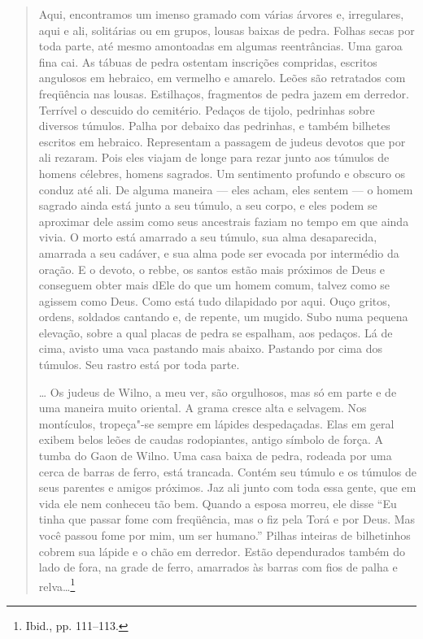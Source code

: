 %
\begin{quote}
Aqui, encontramos um imenso gramado com várias árvores e, irregulares,
aqui e ali, solitárias ou em grupos, lousas baixas de pedra. Folhas
secas por toda parte, até mesmo amontoadas em algumas reentrâncias. Uma
garoa fina cai. As tábuas de pedra ostentam inscrições compridas,
escritos angulosos em hebraico, em vermelho e amarelo. Leões são
retratados com freqüência nas lousas. Estilhaços, fragmentos de pedra
jazem em derredor. Terrível o descuido do cemitério. Pedaços de tijolo,
pedrinhas sobre diversos túmulos. Palha por debaixo das pedrinhas, e
também bilhetes escritos em hebraico. Representam a passagem de judeus
devotos que por ali rezaram. Pois eles viajam de longe para rezar junto
aos túmulos de homens célebres, homens sagrados. Um sentimento profundo
e obscuro os conduz até ali. De alguma maneira --- eles acham, eles sentem
--- o homem sagrado ainda está junto a seu túmulo, a seu corpo, e eles
podem se aproximar dele assim como seus ancestrais faziam no tempo em
que ainda vivia. O morto está amarrado a seu túmulo, sua alma
desaparecida, amarrada a seu cadáver, e sua alma pode ser evocada por
intermédio da oração. E o devoto, o rebbe, os santos estão mais próximos
de Deus e conseguem obter mais dEle do que um homem comum, talvez como
se agissem como Deus. Como está tudo dilapidado por aqui. Ouço gritos,
ordens, soldados cantando e, de repente, um mugido. Subo numa pequena
elevação, sobre a qual placas de pedra se espalham, aos pedaços. Lá de
cima, avisto uma vaca pastando mais abaixo. Pastando por cima dos
túmulos. Seu rastro está por toda parte.

\ldots{} Os judeus de Wilno, a meu ver, são orgulhosos, mas só em parte
e de uma maneira muito oriental. A grama cresce alta e selvagem. Nos
montículos, tropeça"-se sempre em lápides despedaçadas. Elas em geral
exibem belos leões de caudas rodopiantes, antigo símbolo de força. A
tumba do Gaon de Wilno. Uma casa baixa de pedra, rodeada por uma cerca
de barras de ferro, está trancada. Contém seu túmulo e os túmulos de
seus parentes e amigos próximos. Jaz ali junto com toda essa gente, que
em vida ele nem conheceu tão bem. Quando a esposa morreu, ele disse ``Eu
tinha que passar fome com freqüência, mas o fiz pela Torá e por Deus.
Mas você passou fome por mim, um ser humano.'' Pilhas inteiras de
bilhetinhos cobrem sua lápide e o chão em derredor. Estão dependurados
também do lado de fora, na grade de ferro, amarrados às barras com fios
de palha e relva\ldots{}\footnote{Ibid., pp. 111--113.}
\end{quote}

